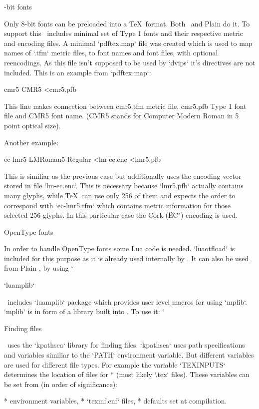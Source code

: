 -bit fonts

Only 8-bit fonts can be preloaded into a \TeX\ format. Both \OpTeX\ and Plain
do it. To support this \LLTeX\ includes minimal set of Type 1 fonts and their
respective metric and encoding files. A minimal `pdftex.map` file was created
which is used to map names of `.tfm` metric files, to font names and font
files, with optional reencodings. As this file isn't supposed to be used by
`dvips` it's directives are not included. This is an example from `pdftex.map`:

\begtt
cmr5 CMR5 <cmr5.pfb
\endtt

This line makes connection between cmr5.tfm metric file, cmr5.pfb Type 1 font
file and CMR5 font name. (CMR5 stands for Computer Modern Roman in 5 point
optical size).

Another example:

\begtt
ec-lmr5 LMRoman5-Regular <lm-ec.enc <lmr5.pfb
\endtt

This is similiar as the previous case but additionally uses the encoding vector
stored in file `lm-ec.enc`. This is necessary because `lmr5.pfb` actually
contains many glyphs, while \TeX\ can use only 256 of them and expects the
order to correspond with `ec-lmr5.tfm` which contains metric information for
those selected 256 glyphs. In this particular case the Cork (\"EC") encoding is
used.

\secc OpenType fonts

In order to handle OpenType fonts some Lua code is needed. `luaotfload` is
included for this purpose as it is already used internally by \OpTeX. It can
also be used from Plain \LuaTeX, by using `

\sec `luamplib`

\LLTeX\ includes `luamplib` package which provides user level macros for using
`mplib`. `mplib` is \Metapost{} in form of a library built into \LuaTeX. To use
it: `

\sec Finding files

\LuaTeX\ uses the `kpathsea` library for finding files. `kpathsea` uses path
specifications and variables similiar to the `PATH` environment variable. But
different variables are used for different file types. For example the variable
`TEXINPUTS` determines the location of files for `` (most likely `.tex`
files). These variables can be set from (in order of significance):

\begitems
* environment variables,
* `texmf.cnf` files,
* defaults set at compilation.
\enditems

